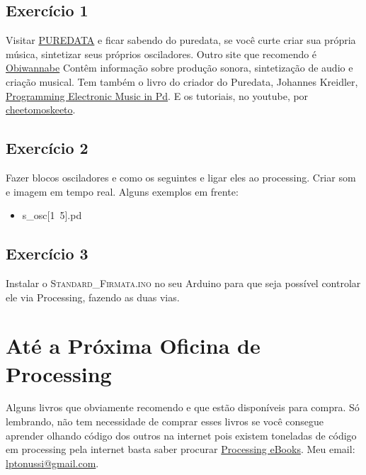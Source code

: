 \documentclass[12pt]{article}
\begin{document}
\subsection{Exercício 1}

\qquad Visitar \href{http://puredata.info/}{PUREDATA} e ficar sabendo do puredata, se você curte criar sua própria música, sintetizar seus próprios osciladores. Outro site que recomendo é \href{http://obiwannabe.co.uk/}{Obiwannabe} Contêm informação sobre produção sonora, sintetização de audio e criação musical. Tem também o livro do criador do Puredata, Johannes Kreidler, \href{http://www.pd-tutorial.com/}{Programming Electronic Music in Pd}. E os tutoriais, no youtube, por \href{http://www.youtube.com/playlist?list=PL12DC9A161D8DC5DC}{cheetomoskeeto}.

\subsection{Exercício 2}

\qquad Fazer blocos osciladores e como os seguintes e ligar eles ao processing. Criar som e imagem em tempo real. Alguns exemplos em frente:

\begin{itemize}
\item s_osc[1~5].pd
\end{itemize}

\subsection{Exercício 3}

\qquad Instalar o \textsc{Standard\_Firmata.ino} no seu Arduino para que seja possível controlar ele via Processing, fazendo as duas vias.


\section{Até a Próxima Oficina de Processing}

\qquad Alguns livros que obviamente recomendo e que estão disponíveis para compra. Só lembrando, não tem necessidade de comprar esses livros se você consegue aprender olhando código dos outros na internet pois existem toneladas de código em processing pela internet basta saber procurar \href{http://www.processing.org/learning/books/}{Processing eBooks}. Meu email: \href{mailto:lptonussi@gmail.com}{lptonussi@gmail.com}.
\end{document}
